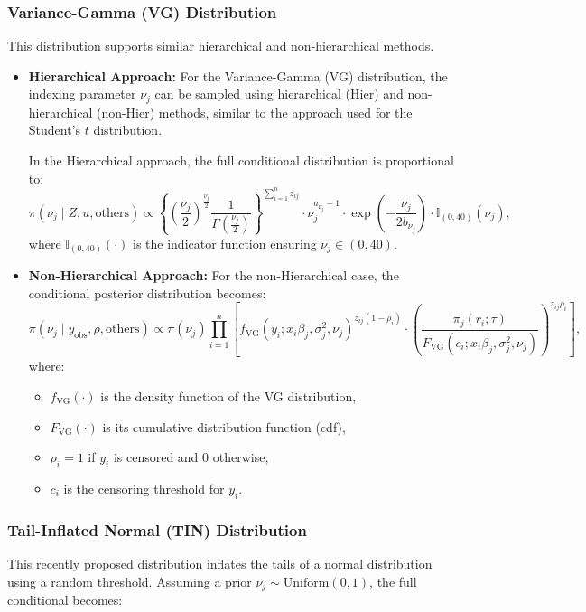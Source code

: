 \documentclass[10.5pt]{article} %
\begin{document}
\subsubsection{Variance-Gamma (VG) Distribution} 
This distribution supports similar hierarchical and non-hierarchical methods. \begin{itemize}
    \item \textbf{Hierarchical Approach:}  
    For the Variance-Gamma (VG) distribution, the indexing parameter $\nu_j$ can be sampled using hierarchical (Hier) and non-hierarchical (non-Hier) methods, similar to the approach used for the Student's $t$ distribution.

    In the Hierarchical approach, the full conditional distribution is proportional to:
    \[
    \pi(\nu_j \mid Z, u, \text{others}) \propto 
    \left\{ \left( \frac{\nu_j}{2} \right)^{\frac{\nu_j}{2}} \frac{1}{\Gamma\left( \frac{\nu_j}{2} \right)} \right\}^{\sum_{i=1}^n z_{ij}} 
    \cdot \nu_j^{a_{\nu_j} - 1} \cdot \exp\left( -\frac{\nu_j}{2b_{\nu_j}} \right) \cdot \mathbb{I}_{(0, 40)}(\nu_j),
    \]
    where $\mathbb{I}_{(0, 40)}(\cdot)$ is the indicator function ensuring $\nu_j \in (0, 40)$.

    \item \textbf{Non-Hierarchical Approach:}  
    For the non-Hierarchical case, the conditional posterior distribution becomes:
    \[
    \pi(\nu_j \mid y_{\text{obs}}, \rho, \text{others}) \propto \pi(\nu_j) \prod_{i=1}^n 
    \left[ f_{\text{VG}}(y_i; x_i \beta_j, \sigma_j^2, \nu_j)^{z_{ij}(1 - \rho_i)} 
    \cdot \left( \frac{\pi_j(r_i; \tau)}{F_{\text{VG}}(c_i; x_i \beta_j, \sigma_j^2, \nu_j)} \right)^{z_{ij} \rho_i} \right],
    \]
    where:
    \begin{itemize}
        \item $f_{\text{VG}}(\cdot)$ is the density function of the VG distribution,
        \item $F_{\text{VG}}(\cdot)$ is its cumulative distribution function (cdf),
        \item $\rho_i = 1$ if $y_i$ is censored and $0$ otherwise,
        \item $c_i$ is the censoring threshold for $y_i$.
    \end{itemize}
\end{itemize}

\subsubsection{Tail-Inflated Normal (TIN) Distribution} 
This recently proposed distribution inflates the tails of a normal distribution using a random threshold. Assuming a prior $\nu_j \sim \text{Uniform}(0, 1)$, the full conditional becomes:
\end{document}
